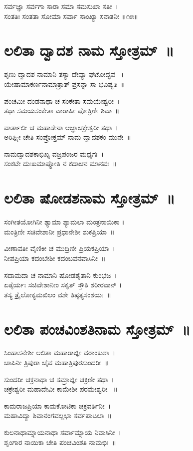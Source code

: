 ಸರ್ವಜ್ಞಾ ಸರ್ವಗಾ ಸಾರಾ ಸಮಾ ಸಮಸುಖಾ ಸತೀ~।\\
ಸಂತತಿಃ ಸಂತತಾ ಸೋಮಾ ಸರ್ವಾ ಸಾಂಖ್ಯಾ ಸನಾತನೀ ॥೧೫॥

\section{ಲಲಿತಾ ದ್ವಾದಶ ನಾಮ ಸ್ತೋತ್ರಮ್~॥}
ಶೃಣು ದ್ವಾದಶ ನಾಮಾನಿ ತಸ್ಯಾ ದೇವ್ಯಾ ಘಟೋದ್ಭವ ~।\\
ಯೇಷಾಮಾಕರ್ಣನಾಮಾತ್ರಾತ್ ಪ್ರಸನ್ನಾ ಸಾ ಭವಿಷ್ಯತಿ~॥

ಪಂಚಮೀ ದಂಡನಾಥಾ ಚ ಸಂಕೇತಾ ಸಮಯೇಶ್ವರೀ~।\\
ತಥಾ ಸಮಯಸಂಕೇತಾ ವಾರಾಹೀ ಪೋತ್ರಿಣೀ ಶಿವಾ~॥

ವಾರ್ತಾಲೀ ಚ ಮಹಾಸೇನಾ ಆಜ್ಞಾಚಕ್ರೇಶ್ವರೀ ತಥಾ~।\\
ಅರಿಘ್ನೀ ಚೇತಿ ಸಂಪ್ರೋಕ್ತಮ್ ನಾಮ ದ್ವಾದಶಕಂ ಮುನೇ~॥

ನಾಮದ್ವಾದಶಕಾಭಿಖ್ಯ ವಜ್ರಪಂಜರ ಮಧ್ಯಗಃ~।\\
ಸಂಕಟೇ ದುಃಖಮಾಪ್ನೋತಿ ನ ಕದಾಚನ ಮಾನವಃ~॥
\section{ಲಲಿತಾ ಷೋಡಶನಾಮ ಸ್ತೋತ್ರಮ್~॥}
ಸಂಗೀತಯೋಗಿನೀ ಶ್ಯಾಮಾ ಶ್ಯಾಮಲಾ ಮಂತ್ರನಾಯಿಕಾ ।\\
ಮಂತ್ರಿಣೀ ಸಚಿವೇಶಾನೀ ಪ್ರಧಾನೇಶೀ ಶುಕಪ್ರಿಯಾ~॥

ವೀಣಾವತೀ ವೈಣಿಕೀ ಚ ಮುದ್ರಿಣೀ ಪ್ರಿಯಕಪ್ರಿಯಾ~।\\
ನೀಪಪ್ರಿಯಾ ಕದಂಬೇಶೀ ಕದಂಬವನವಾಸಿನೀ~॥

ಸದಾಮದಾ ಚ ನಾಮಾನಿ ಷೋಡಶೈತಾನಿ ಕುಂಭಜ~।\\
ಏತೈರ್ಯಃ ಸಚಿವೇಶಾನೀಂ ಸಕೃತ್ ಸ್ತೌತಿ ಶರೀರವಾನ್ ।\\
ತಸ್ಯ ತ್ರೈಲೋಕ್ಯಮಖಿಲಂ ವಶೇ ತಿಷ್ಠತ್ಯಸಂಶಯಃ~॥
\section{ಲಲಿತಾ ಪಂಚವಿಂಶತಿನಾಮ ಸ್ತೋತ್ರಮ್~॥}
ಸಿಂಹಾಸನೇಶೀ ಲಲಿತಾ ಮಹಾರಾಜ್ಞೀ ವರಾಂಕುಶಾ~।\\
ಚಾಪಿನೀ ತ್ರಿಪುರಾ ಚೈವ ಮಹಾತ್ರಿಪುರಸುಂದರೀ~॥

ಸುಂದರೀ ಚಕ್ರನಾಥಾ ಚ ಸಮ್ರಾಜ್ಞೀ ಚಕ್ರಿಣೀ ತಥಾ~।\\
ಚಕ್ರೇಶ್ವರೀ ಮಹಾದೇವೀ ಕಾಮೇಶೀ ಪರಮೇಶ್ವರೀ ~॥

ಕಾಮರಾಜಪ್ರಿಯಾ ಕಾಮಕೋಟಿಕಾ ಚಕ್ರವರ್ತಿನೀ~।\\
ಮಹಾವಿದ್ಯಾ ಶಿವಾನಂಗವಲ್ಲಭಾ ಸರ್ವಪಾಟಲಾ~॥

ಕುಲನಾಥಾಮ್ನಾಯನಾಥಾ ಸರ್ವಾಮ್ನಾಯ ನಿವಾಸಿನೀ~।\\
ಶೃಂಗಾರ ನಾಯಿಕಾ ಚೇತಿ ಪಂಚವಿಂಶತಿ ನಾಮಭಿಃ~॥

